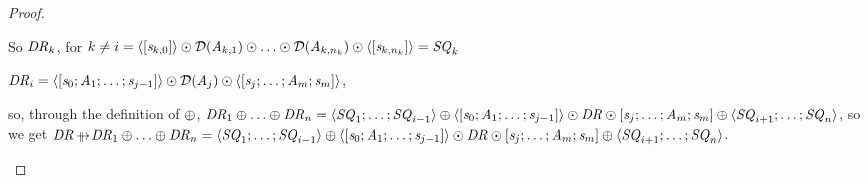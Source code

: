 \documentclass[numbers,10pt,preprint\ifanon ,nocopyrightspace\fi]{sigplanconf}
\begin{document}
\begin{proof}
\begin{case}[\DNFStructuralRewriteRule{}]
    So $\mathit{DR}_k$, for $k \neq i =
    \langle[\mathit{s}_{k,0}]\rangle \odot \mathcal{D}(\mathit{A}_{k,1})
    \odot \ldots \odot \mathcal{D}(\mathit{A}_{k,n_k}) \odot
    \langle[\mathit{s}_{k,n_k}]\rangle = \mathit{SQ}_k$

    $\mathit{DR}_i =
    \langle[\mathit{s}_0;\mathit{A}_1;\ldots;\mathit{s}_{j-1}]\rangle
    \odot \mathcal{D}(\mathit{A}_j) \odot
    \langle[\mathit{s}_j;\ldots;\mathit{A}_m;\mathit{s}_m]\rangle$,

    so, through the definition of $\oplus$,
    $\mathit{DR}_1 \oplus \ldots \oplus \mathit{DR}_n =
    \langle\mathit{SQ}_1;\ldots;\mathit{SQ}_{i-1}\rangle \oplus
    \langle[\mathit{s}_0;\mathit{A}_1;\ldots;\mathit{s}_{j-1}]\rangle\odot\mathit{DR}\odot[\mathit{s}_j;\ldots;\mathit{A}_m;\mathit{s}_m] \oplus
    \langle\mathit{SQ}_{i+1};\ldots;\mathit{SQ}_n\rangle$,
    so we get $\DNFRegex \ParallelRewrite \DNFRegex_1 \OrDNF \ldots \OrDNF \DNFRegex_n =
    \DNFOf{\Sequence_1\DNFSep\ldots\DNFSep\Sequence_{i-1}} \OrDNF
    \DNFOf{\SequenceOf{\String_0\SequenceSep\Atom_1\SequenceSep\ldots\SequenceSep\String_{j-1}}}\ConcatDNF\DNFRegex\ConcatDNF\SequenceOf{\String_j\SequenceSep\ldots\SequenceSep\Atom_m\SequenceSep\String_m} \OrDNF
    \DNFOf{\Sequence_{i+1}\DNFSep\ldots\DNFSep\Sequence_n}$.
  \end{case}
\end{proof}
\end{document}
